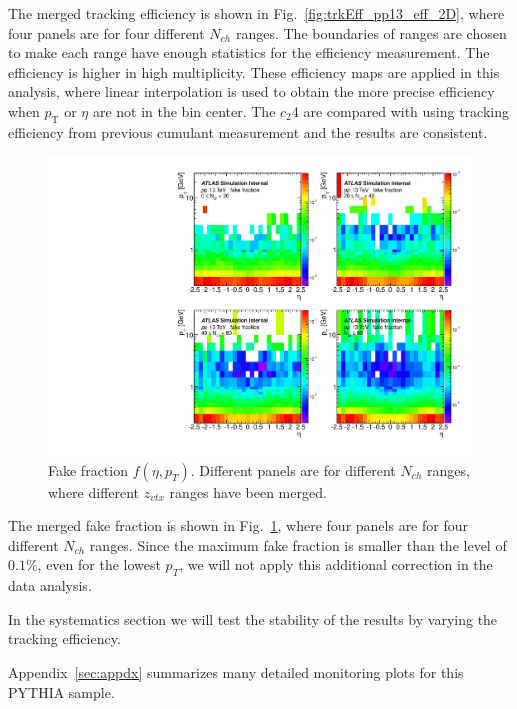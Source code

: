 The merged tracking efficiency is shown in Fig.~\ref{fig:trkEff_pp13_eff_2D}, where four panels are for four different $N_{ch}$ ranges. The boundaries of ranges are chosen to make each range have enough statistics for the efficiency measurement. The efficiency is higher in high multiplicity. These efficiency maps are applied in this analysis, where linear interpolation is used to obtain the more precise efficiency when $p_{\text{T}}$ or $\eta$ are not in the bin center. The $c_{2}{4}$ are compared with using tracking efficiency from previous cumulant measurement and the results are consistent.

\begin{figure}[H]
\centering
\includegraphics[width=1.\linewidth]{figs/sec_evtSlc/trkEff_pp13_fak_2D.pdf}
\caption{Fake fraction $f(\eta,p_{T})$. Different panels are for different $N_{ch}$ ranges, where different $z_{vtx}$ ranges have been merged.}
\label{fig:trkEff_pp13_fak_2D}
\end{figure}

The merged fake fraction is shown in Fig.~\ref{fig:trkEff_pp13_fak_2D}, where four panels are for four different $N_{ch}$ ranges. Since the maximum fake fraction is smaller than the level of $0.1\%$, even for the lowest $p_{T}$, we will not apply this additional correction in the data analysis.

In the systematics section we will test the stability of the results by varying the tracking efficiency.

Appendix~\ref{sec:appdx} summarizes many detailed monitoring plots for this PYTHIA sample.



